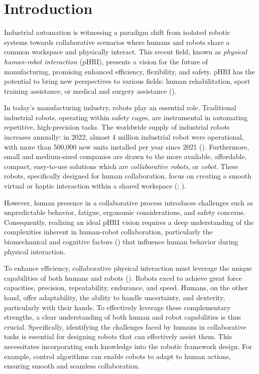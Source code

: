 \chapter*{Introduction}
\label{chapter:introduction}

\setcounter{page}{1}
\pagestyle{fancy}

Industrial automation is witnessing a paradigm shift from isolated robotic systems towards collaborative scenarios where humans and robots share a common workspace and physically interact. This recent field, known as \emph{physical human-robot interaction} (pHRI), presents a vision for the future of manufacturing, promising enhanced efficiency, flexibility, and safety. pHRI has the potential to bring new perspectives to various fields: human rehabilitation, sport training assistance, or medical and surgery assistance (\cite{benoussaadEditorialPhysicalHumanrobot2022}).

In today's manufacturing industry, robots play an essential role. 
Traditional industrial robots, operating within safety cages, are instrumental in automating repetitive, high-precision tasks. The worldwide supply of industrial robots increases annually: in 2022, almost 4 million industrial robot were operational, with more than 500,000 new units installed per year since 2021 (\cite{ifr2023}). Furthermore, small and medium-sized companies are drawn to the more available, affordable, compact, easy-to-use solutions which are \emph{collaborative robots}, or \emph{cobot}. These robots, specifically designed for human collaboration, focus on creating a smooth virtual or haptic interaction within a shared workspace (\cite{peshkinCobotArchitecture2001}; \cite{villaniSurveyHumanRobot2018}).

However, human presence in a collaborative process introduces challenges such as unpredictable behavior, fatigue, ergonomic considerations, and safety concerns. Consequently, realizing an ideal pHRI vision requires a deep understanding of the complexities inherent in human-robot collaboration, particularly the biomechanical and cognitive factors (\cite{camblorExploitationMouvementRobot2024}) that influence human behavior during physical interaction.

To enhance efficiency, collaborative physical interaction must leverage the unique capabilities of both humans and robots (\cite{colgateCobotsRobotsCollaboration1996}). Robots excel to achieve great force capacities, precision, repeatability, endurance, and speed. Humans, on the other hand, offer adaptability, the ability to handle uncertainty, and dexterity, particularly with their hands. To effectively leverage these complementary strengths, a clear understanding of both human and robot capabilities is thus crucial. Specifically, identifying the challenges faced by humans in collaborative tasks is essential for designing robots that can effectively assist them. This necessitates incorporating such knowledge into the robotic framework design. For example, control algorithms can enable cobots to adapt to human actions, ensuring smooth and seamless collaboration. 

